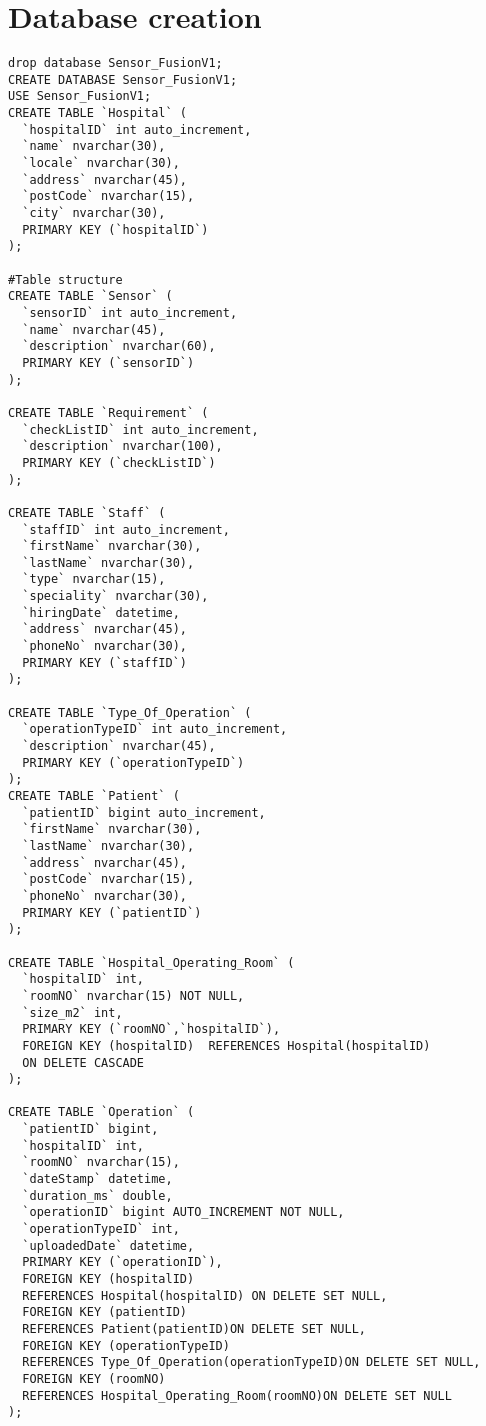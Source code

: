 \section{Database creation}
\begin{lstlisting}
drop database Sensor_FusionV1;
CREATE DATABASE Sensor_FusionV1;
USE Sensor_FusionV1;
CREATE TABLE `Hospital` (
  `hospitalID` int auto_increment,
  `name` nvarchar(30),
  `locale` nvarchar(30),
  `address` nvarchar(45),
  `postCode` nvarchar(15),
  `city` nvarchar(30),
  PRIMARY KEY (`hospitalID`) 
);

#Table structure
CREATE TABLE `Sensor` (
  `sensorID` int auto_increment,
  `name` nvarchar(45),
  `description` nvarchar(60),
  PRIMARY KEY (`sensorID`)
);

CREATE TABLE `Requirement` (
  `checkListID` int auto_increment,
  `description` nvarchar(100),
  PRIMARY KEY (`checkListID`)
);

CREATE TABLE `Staff` (
  `staffID` int auto_increment,
  `firstName` nvarchar(30),
  `lastName` nvarchar(30),
  `type` nvarchar(15),
  `speciality` nvarchar(30),
  `hiringDate` datetime,
  `address` nvarchar(45),
  `phoneNo` nvarchar(30),
  PRIMARY KEY (`staffID`)
);

CREATE TABLE `Type_Of_Operation` (
  `operationTypeID` int auto_increment,
  `description` nvarchar(45),
  PRIMARY KEY (`operationTypeID`)
);
CREATE TABLE `Patient` (
  `patientID` bigint auto_increment,
  `firstName` nvarchar(30),
  `lastName` nvarchar(30),
  `address` nvarchar(45),
  `postCode` nvarchar(15),
  `phoneNo` nvarchar(30),
  PRIMARY KEY (`patientID`)
);

CREATE TABLE `Hospital_Operating_Room` (
  `hospitalID` int,
  `roomNO` nvarchar(15) NOT NULL,
  `size_m2` int,
  PRIMARY KEY (`roomNO`,`hospitalID`),
  FOREIGN KEY (hospitalID)  REFERENCES Hospital(hospitalID)
  ON DELETE CASCADE
);

CREATE TABLE `Operation` (
  `patientID` bigint,
  `hospitalID` int,
  `roomNO` nvarchar(15),
  `dateStamp` datetime,
  `duration_ms` double,
  `operationID` bigint AUTO_INCREMENT NOT NULL,
  `operationTypeID` int,
  `uploadedDate` datetime,
  PRIMARY KEY (`operationID`),
  FOREIGN KEY (hospitalID) 
  REFERENCES Hospital(hospitalID) ON DELETE SET NULL,
  FOREIGN KEY (patientID)
  REFERENCES Patient(patientID)ON DELETE SET NULL,
  FOREIGN KEY (operationTypeID)
  REFERENCES Type_Of_Operation(operationTypeID)ON DELETE SET NULL,
  FOREIGN KEY (roomNO)
  REFERENCES Hospital_Operating_Room(roomNO)ON DELETE SET NULL
);


\end{lstlisting}
